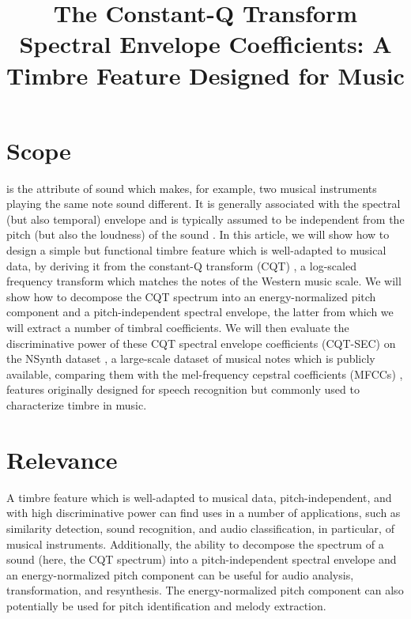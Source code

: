 \documentclass[journal]{IEEEtran}
\begin{document}
\title{The Constant-Q Transform Spectral Envelope Coefficients: A Timbre Feature Designed for Music}

\maketitle

\section{Scope}

 is the attribute of sound which makes, for example, two musical instruments playing the same note sound different. It is generally associated with the spectral (but also temporal) envelope and is typically assumed to be independent from the pitch (but also the loudness) of the sound \cite{moore2004}. In this article, we will show how to design a simple but functional timbre feature which is well-adapted to musical data, by deriving it from the constant-Q transform (CQT) \cite{brown1991, brown1992}, a log-scaled frequency transform which matches the notes of the Western music scale. We will show how to decompose the CQT spectrum into an energy-normalized pitch component and a pitch-independent spectral envelope, the latter from which we will extract a number of timbral coefficients. We will then evaluate the discriminative power of these CQT spectral envelope coefficients (CQT-SEC) on the NSynth dataset \cite{engel2017}, a large-scale dataset of musical notes which is publicly available, comparing them with the mel-frequency cepstral coefficients (MFCCs) \cite{davis1980}, features originally designed for speech recognition but commonly used to characterize timbre in music. 


\section{Relevance}

A timbre feature which is well-adapted to musical data, pitch-independent, and with high discriminative power can find uses in a number of applications, such as similarity detection, sound recognition, and audio classification, in particular, of musical instruments. Additionally, the ability to decompose the spectrum of a sound (here, the CQT spectrum) into a pitch-independent spectral envelope and an energy-normalized pitch component can be useful for audio analysis, transformation, and resynthesis. The energy-normalized pitch component can also potentially be used for pitch identification and melody extraction. 
\end{document}
